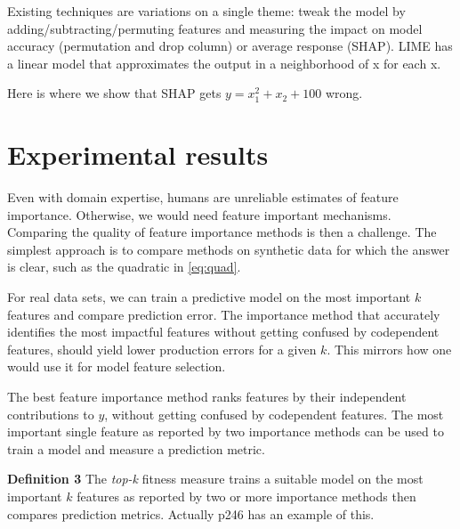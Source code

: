\documentclass[12pt]{article}
\newcommand{\todo}[1]{{{\color{red}{[#1]}}}}
\begin{document}
Existing techniques are variations on a single theme: tweak the model by adding/subtracting/permuting features and measuring the impact on model accuracy (permutation and drop column) or average response (SHAP). LIME has a linear model that approximates the output in a neighborhood of x for each x.

Here is where we show that SHAP gets $y = x_1^2 + x_2 + 100$ wrong.

\section{Experimental results}\label{sec:experiments}

\todo{an experiment where we show and sensitive to noise column}

\todo{maybe show the linear 1 1 1 codependence example}

\todo{what about outlier example}

\todo{stability is valuable. users would not trust results that changed significantly for small data set changes. show our error bars from bootstrapping and say we can do p-values.}

\todo{bulldozer: YearMade ignores too much with stratpd, use catstrat}

Even with domain expertise, humans are unreliable estimates of feature importance. Otherwise, we would need feature important mechanisms. Comparing the quality of feature importance methods is then a challenge. The simplest approach is to compare methods on synthetic data for which the answer is clear, such as the quadratic in \ref{eq:quad}.

For real data sets, we can train a predictive model on the most important $k$ features and compare prediction error. The importance method that accurately identifies the most impactful features without getting confused by codependent features, should yield lower production errors for a given $k$.   This mirrors how one would use it for model feature selection.
 
The best feature importance method ranks features by their independent contributions to $y$, without getting confused by codependent features. The most important single feature as reported by two importance methods can be used to train a model and measure a prediction metric.
 
{\bf Definition 3} The {\em top-k} fitness measure trains a suitable model on the  most important $k$ features as reported by two or more importance methods then compares prediction metrics. Actually p246 \cite{liu-fs} has an example of this.
\end{document}
